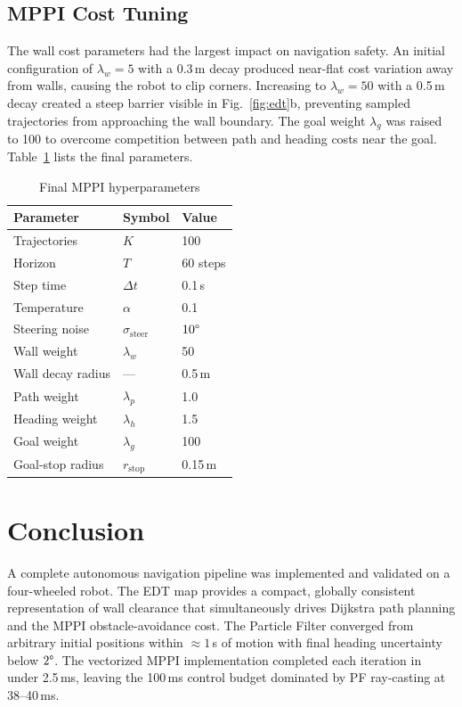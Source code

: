 \documentclass[conference]{IEEEtran}
\begin{document}
\subsection{MPPI Cost Tuning}

The wall cost parameters had the largest impact on navigation safety. An initial configuration of $\lambda_w{=}5$ with a 0.3\,m decay produced near-flat cost variation away from walls, causing the robot to clip corners. Increasing to $\lambda_w{=}50$ with a 0.5\,m decay created a steep barrier visible in Fig.~\ref{fig:edt}b, preventing sampled trajectories from approaching the wall boundary. The goal weight $\lambda_g$ was raised to 100 to overcome competition between path and heading costs near the goal. Table~\ref{tab:mppi_params} lists the final parameters.

\begin{table}[htbp]
\centering
\caption{Final MPPI hyperparameters}
\label{tab:mppi_params}
\begin{tabular}{lll}
\toprule
Parameter & Symbol & Value \\
\midrule
Trajectories       & $K$                     & 100 \\
Horizon            & $T$                     & 60 steps \\
Step time          & $\Delta t$              & 0.1\,s \\
Temperature        & $\alpha$                & 0.1 \\
Steering noise     & $\sigma_\mathrm{steer}$ & $10\degree$ \\
Wall weight        & $\lambda_w$             & 50 \\
Wall decay radius  & ---                     & 0.5\,m \\
Path weight        & $\lambda_p$             & 1.0 \\
Heading weight     & $\lambda_h$             & 1.5 \\
Goal weight        & $\lambda_g$             & 100 \\
Goal-stop radius   & $r_\mathrm{stop}$       & 0.15\,m \\
\bottomrule
\end{tabular}
\end{table}

\section{Conclusion}
\label{sec:conclusion}

A complete autonomous navigation pipeline was implemented and validated on a four-wheeled robot. The EDT map provides a compact, globally consistent representation of wall clearance that simultaneously drives Dijkstra path planning and the MPPI obstacle-avoidance cost. The Particle Filter converged from arbitrary initial positions within ${\approx}1$\,s of motion with final heading uncertainty below $2\degree$. The vectorized MPPI implementation completed each iteration in under 2.5\,ms, leaving the 100\,ms control budget dominated by PF ray-casting at 38--40\,ms.
\end{document}
